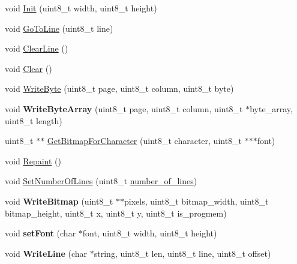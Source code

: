 \begin{DoxyCompactItemize}
\item 
void \hyperlink{class_o_l_e_d_a2c8205c8eac9d7a2b181657561e9b4d2}{Init} (uint8\+\_\+t width, uint8\+\_\+t height)
\item 
void \hyperlink{class_o_l_e_d_a8d314130676b104ed959b92ab4bac25e}{Go\+To\+Line} (uint8\+\_\+t line)
\item 
void \hyperlink{class_o_l_e_d_a3a571f5ea7a183fa14932cd5b2c423eb}{Clear\+Line} ()
\item 
void \hyperlink{class_o_l_e_d_a6c7bb1fc91b3e574a275f90643da140a}{Clear} ()
\item 
void \hyperlink{class_o_l_e_d_a7fa307269dbd2e80a6e48a1442df83d2}{Write\+Byte} (uint8\+\_\+t page, uint8\+\_\+t column, uint8\+\_\+t byte)
\item 
\hypertarget{class_o_l_e_d_a7fffc17a5439300d361414c15a7a2dbe}{}\label{class_o_l_e_d_a7fffc17a5439300d361414c15a7a2dbe} 
void {\bfseries Write\+Byte\+Array} (uint8\+\_\+t page, uint8\+\_\+t column, uint8\+\_\+t $\ast$byte\+\_\+array, uint8\+\_\+t length)
\item 
uint8\+\_\+t $\ast$$\ast$ \hyperlink{class_o_l_e_d_aa5b96cbf30cf3ad632942bf78c14ca3a}{Get\+Bitmap\+For\+Character} (uint8\+\_\+t character, uint8\+\_\+t $\ast$$\ast$$\ast$font)
\item 
void \hyperlink{class_o_l_e_d_a3efa34861b4ae0bc5323f6b7cf1d8a01}{Repaint} ()
\item 
void \hyperlink{class_o_l_e_d_aa3c88e19f05340036ea5ac9e2d1ea5dc}{Set\+Number\+Of\+Lines} (uint8\+\_\+t \hyperlink{class_o_l_e_d_a9ea1c55112deede1a61142af276a6bc9}{number\+\_\+of\+\_\+lines})
\item 
\hypertarget{class_o_l_e_d_a541cf3d3db343ab33e4830b7dde05ca3}{}\label{class_o_l_e_d_a541cf3d3db343ab33e4830b7dde05ca3} 
void {\bfseries Write\+Bitmap} (uint8\+\_\+t $\ast$$\ast$pixels, uint8\+\_\+t bitmap\+\_\+width, uint8\+\_\+t bitmap\+\_\+height, uint8\+\_\+t x, uint8\+\_\+t y, uint8\+\_\+t is\+\_\+progmem)
\item 
\hypertarget{class_o_l_e_d_a7620c3f21a1a26beba5b5a6bcac34a45}{}\label{class_o_l_e_d_a7620c3f21a1a26beba5b5a6bcac34a45} 
void {\bfseries set\+Font} (char $\ast$font, uint8\+\_\+t width, uint8\+\_\+t height)
\item 
\hypertarget{class_o_l_e_d_ae565a0831cb79bb7c8840170a50e006b}{}\label{class_o_l_e_d_ae565a0831cb79bb7c8840170a50e006b} 
void {\bfseries Write\+Line} (char $\ast$string, uint8\+\_\+t len, uint8\+\_\+t line, uint8\+\_\+t offset)
\end{DoxyCompactItemize}
